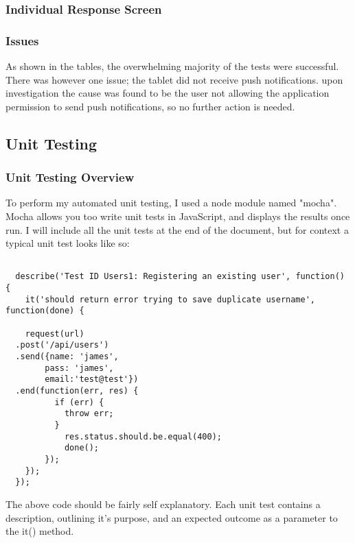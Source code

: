 \documentclass[a4paper]{article}
\begin{document}
\begin{center}
\end{center}

\subsubsection{Individual Response Screen}

\begin{center}
\end{center}

\subsubsection{Issues}
As shown in the tables, the overwhelming majority of the tests were successful. There was however one issue; the tablet did not receive push notifications. upon investigation the cause was found to be the user not allowing the application permission to send push notifications, so no further action is needed.


\subsection{Unit Testing}
\subsubsection{Unit Testing Overview}
To perform my automated unit testing, I used a node module named "mocha".
Mocha allows you too write unit tests in JavaScript, and displays the results once run.
I will include all the unit tests at the end of the document, but for context a typical unit test looks like so:
\begin{lstlisting}[label=Code for a typical unit test,caption=Code for a typical unit test]

  describe('Test ID Users1: Registering an existing user', function() {
    it('should return error trying to save duplicate username', function(done) {

    request(url)
  .post('/api/users')
  .send({name: 'james',
        pass: 'james',
        email:'test@test'})
  .end(function(err, res) {
          if (err) {
            throw err;
          }
            res.status.should.be.equal(400);
            done();
        });
    });
  });
\end{lstlisting} 
The above code should be fairly self explanatory. Each unit test contains a description, outlining it's purpose, and an expected outcome as a parameter to the it() method.
\end{document}
